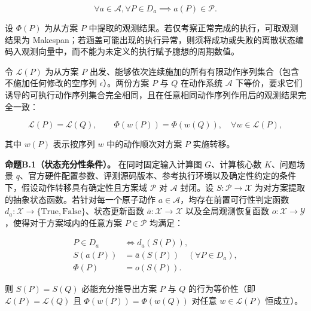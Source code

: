 \documentclass[anonymous,notoc]{gmcm2026}
\begin{document}
\begin{equation}
\forall a \in \mathcal{A}, \forall P \in D_a \implies a(P) \in \mathcal{P}.
\end{equation}

设 \(\Phi(P)\) 为从方案 \(P\) 中提取的观测结果。若仅考察正常完成的执行，可取观测结果为 Makespan；若涵盖可能出现的执行异常，则须将成功或失败的离散状态编码入观测向量中，而不能为未定义的执行赋予臆想的周期数值。

令 \(\mathcal{L}(P)\) 为从方案 \(P\) 出发、能够依次连续施加的所有有限动作序列集合（包含不施加任何修改的空序列 \(\epsilon\)）。两份方案 \(P\) 与 \(Q\) 在动作系统 \(\mathcal{A}\) 下等价，要求它们诱导的可执行动作序列集合完全相同，且在任意相同动作序列作用后的观测结果完全一致：

\begin{equation}
\mathcal{L}(P) = \mathcal{L}(Q), \qquad \Phi(w(P)) = \Phi(w(Q)), \quad \forall w \in \mathcal{L}(P),
\end{equation}

其中 \(w(P)\) 表示按序列 \(w\) 中的动作顺次对方案 \(P\) 实施转移。

\textbf{命题B.1（状态充分性条件）。} 在同时固定输入计算图 \(G\)、计算核心数 \(K\)、问题场景 \(q\)、官方硬件配置参数、评测源码版本、参考执行环境以及确定性约定的条件下，假设动作转移具有确定性且方案域 \(\mathcal{P}\) 对 \(\mathcal{A}\) 封闭。设 \(S: \mathcal{P} \to \mathcal{X}\) 为对方案提取的抽象状态函数。若针对每一个原子动作 \(a \in \mathcal{A}\)，均存在前置可行性判定函数 \(d_a: \mathcal{X} \to \{\text{True}, \text{False}\}\)、状态更新函数 \(\bar{a}: \mathcal{X} \to \mathcal{X}\) 以及全局观测恢复函数 \(o: \mathcal{X} \to \mathcal{Y}\)，使得对于方案域内的任意方案 \(P \in \mathcal{P}\) 均满足：

\begin{equation}
\begin{aligned}
P \in D_a &\iff d_a(S(P)), \\
S(a(P)) &= \bar{a}(S(P)) \quad (\forall P \in D_a), \\
\Phi(P) &= o(S(P)).
\end{aligned}
\end{equation}

则 \(S(P) = S(Q)\) 必能充分推导出方案 \(P\) 与 \(Q\) 的行为等价性（即 \(\mathcal{L}(P) = \mathcal{L}(Q)\) 且 \(\Phi(w(P)) = \Phi(w(Q))\) 对任意 \(w \in \mathcal{L}(P)\) 恒成立）。
\end{document}
